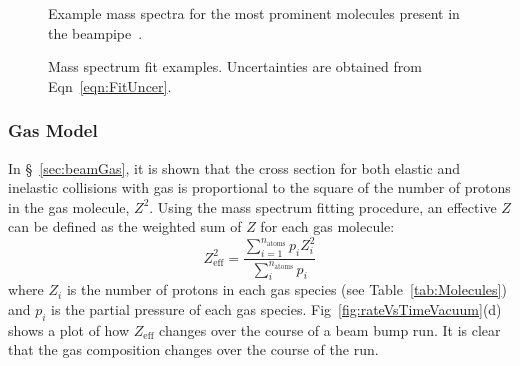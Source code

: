 \begin{figure}
	\centering
	\caption[Example mass spectra]{Example mass spectra for the most prominent molecules present in the beampipe~\cite{nistMassSpec}.}
	\label{fig:ExampleMassSpecs}
\end{figure}



	
\begin{figure}
	\centering
	\caption[Mass spectrum fit examples]{Mass spectrum fit examples. Uncertainties are obtained from Eqn~\ref{eqn:FitUncer}.}	
	\label{fig:MassSpecFitting}
\end{figure}

\subsubsection{Gas Model}

In \S~\ref{sec:beamGas}, it is shown that the cross section for both elastic and inelastic collisions with gas is proportional to the square of the number of protons in the gas molecule, $Z^2$. Using the mass spectrum fitting procedure, an effective $Z$ can be defined as the weighted sum of $Z$ for each gas molecule:
\begin{equation}
	{Z_{\mathrm{eff}}^2 = \frac{\sum_{i=1}^{n_{\mathrm{atoms}}}p_{i}Z_{i}^2}{\sum_{i}^{n_{\mathrm{atoms}}}p_i}}
	\label{eqn:ZEFF}
\end{equation}
where $Z_{i}$ is the number of protons in each gas species (see Table~\ref{tab:Molecules}) and $p_i$ is the partial pressure of each gas species. Fig~\ref{fig:rateVsTimeVacuum}(d) shows a plot of how $Z_{\mathrm{eff}}$ changes over the course of a beam bump run. It is clear that the gas composition changes over the course of the run. 


